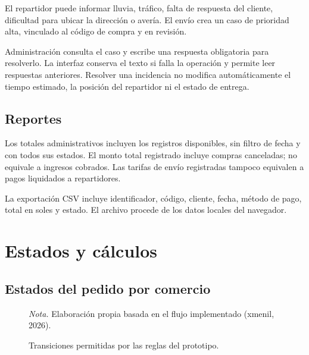\documentclass[12pt,letterpaper]{article}
\begin{document}
El repartidor puede informar lluvia, tráfico, falta de respuesta del cliente, dificultad para ubicar la dirección o avería. El envío crea un caso de prioridad alta, vinculado al código de compra y en revisión.

Administración consulta el caso y escribe una respuesta obligatoria para resolverlo. La interfaz conserva el texto si falla la operación y permite leer respuestas anteriores. Resolver una incidencia no modifica automáticamente el tiempo estimado, la posición del repartidor ni el estado de entrega.

\subsection{Reportes}

Los totales administrativos incluyen los registros disponibles, sin filtro de fecha y con todos sus estados. El monto total registrado incluye compras canceladas; no equivale a ingresos cobrados. Las tarifas de envío registradas tampoco equivalen a pagos liquidados a repartidores.

La exportación CSV incluye identificador, código, cliente, fecha, método de pago, total en soles y estado. El archivo procede de los datos locales del navegador.

\section{Estados y cálculos}

\subsection{Estados del pedido por comercio}

\begin{figure}[htbp]
\caption{Transiciones permitidas por las reglas del prototipo.}
\centering
{}
\par\medskip
\noindent\textit{Nota.} Elaboración propia basada en el flujo implementado (xmenil, 2026).
\end{figure}
\end{document}
